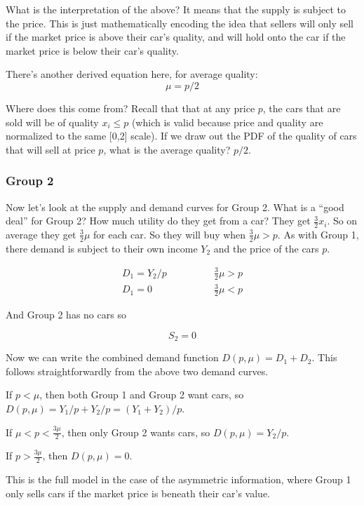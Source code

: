 \documentclass[11pt]{article}
\begin{document}
What is the interpretation of the above? It means that the supply is subject to the price. This is just mathematically encoding the idea that sellers will only sell if the market price is above their car's quality, and will hold onto the car if the market price is below their car's quality. 

There's another derived equation here, for average quality:
\begin{equation}
    \mu = p/2
\end{equation}

Where does this come from? Recall that that at any price $p$, the cars that are sold will be of quality $x_i \leq p$ (which is valid because price and quality are normalized to the same [0,2] scale). If we draw out the PDF of the quality of cars that will sell at price $p$, what is the average quality? $p/2$.

\subsubsection{Group 2}

Now let's look at the supply and demand curves for Group 2. What is a ``good deal'' for Group 2? How much utility do they get from a car? They get $\frac{3}{2}x_i$. So on average they get $\frac{3}{2}\mu$ for each car. So they will buy when $\frac{3}{2}\mu > p$.
As with Group 1, there demand is subject to their own income $Y_2$ and the price of the cars $p$. 

\begin{align*}
D_1 = Y_2/p & \qquad \qquad \frac{3}{2}\mu > p \\
D_1 = 0 & \qquad \qquad \frac{3}{2}\mu < p
\end{align*}

And Group 2 has no cars so 

$$S_2 = 0$$

Now we can write the combined demand function $D(p, \mu) = D_1 + D_2$. This follows straightforwardly from the above two demand curves. 

If $p<\mu$, then both Group 1 and Group 2 want cars, so $D(p, \mu) = Y_1/p + Y_2/p = (Y_1 + Y_2)/p$.

If $\mu < p < \frac{3\mu}{2}$, then only Group 2 wants cars, so $D(p, \mu) = Y_2/p$.

If $ p > \frac{3\mu}{2}$, then $D(p, \mu) = 0$. 

This is the full model in the case of the asymmetric information, where Group 1 only sells cars if the market price is beneath their car's value. 
\end{document}
